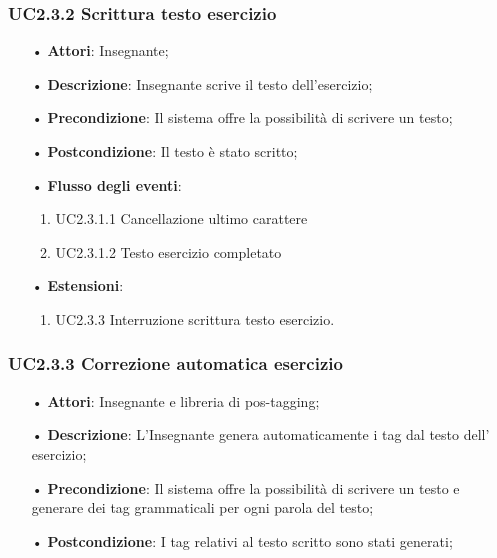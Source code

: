 \subsubsection{UC2.3.2 Scrittura testo esercizio}
\begin{itemize}
	\item[•] \textbf{Attori}: Insegnante;
	\item[•] \textbf{Descrizione}: Insegnante scrive il testo dell’esercizio;
	\item[•] \textbf{Precondizione}: Il sistema offre la possibilità di scrivere un testo;
	\item[•] \textbf{Postcondizione}: Il testo è stato scritto;
	\item[•] \textbf{Flusso degli eventi}:
	\begin{enumerate}
		\item UC2.3.1.1	Cancellazione ultimo carattere
		\item UC2.3.1.2	Testo esercizio completato
	\end{enumerate}
	\item[•] \textbf{Estensioni}:	
	\begin{enumerate}
		\item UC2.3.3 Interruzione scrittura testo esercizio.
	\end{enumerate}
\end{itemize}


\subsubsection{UC2.3.3	Correzione automatica esercizio}
\begin{itemize}
	\item[•] \textbf{Attori}: Insegnante e libreria di pos-tagging;
	\item[•] \textbf{Descrizione}: L’Insegnante genera automaticamente i tag dal testo dell’ esercizio;
	\item[•] \textbf{Precondizione}: Il sistema offre la possibilità di scrivere un testo e generare dei tag grammaticali per ogni parola del testo;
	\item[•] \textbf{Postcondizione}: I tag relativi al testo scritto sono stati generati;
\end{itemize}

